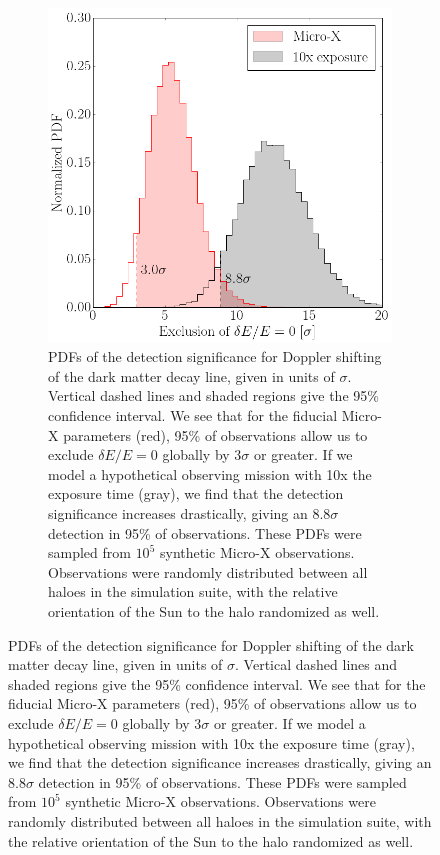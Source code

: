 \documentclass[aps,prd,10pt,twocolumn,superscriptaddress,showpacs]{revtex4-1}
\begin{document}
\begin{figure}[h!]
\begin{figure}[h!]
\centering
\includegraphics[width=1.0\columnwidth]{sig_pdf.png}
\caption{ 
	PDFs of the detection significance for Doppler shifting of the dark matter decay line, given in
	units of $\sigma$. Vertical dashed lines and shaded regions give the 95\% confidence interval.
	We see that for the fiducial Micro-X parameters (red), 95\% of observations allow us to exclude
	$\delta E/E=0$ globally by $3\sigma$ or greater. If we model a hypothetical observing mission with
	10x the exposure time (gray), we find that the detection significance increases drastically, giving an
	$8.8\sigma$ detection in 95\% of observations. 
	These PDFs were sampled from $10^5$ synthetic Micro-X observations. Observations were randomly distributed
	between all haloes in the simulation suite, with the relative orientation of the Sun to the halo
	randomized as well. 
}
\label{fig:sigma_pdf}
\end{figure}



\end{figure}
\end{document}
